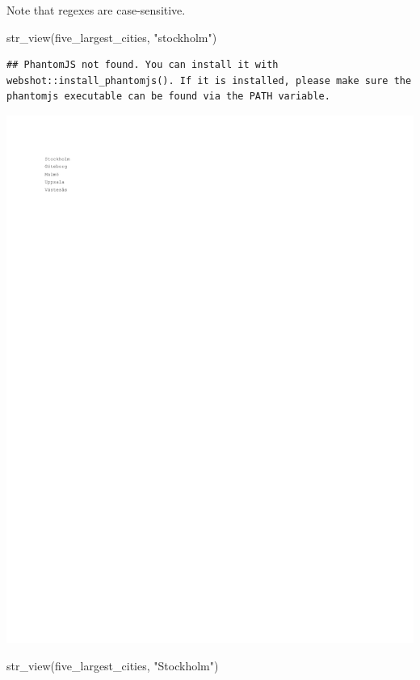 \documentclass[
]{book}
\newenvironment{Shaded}{\begin{snugshade}}{\end{snugshade}}
\newcommand{\FunctionTok}[1]{\textcolor[rgb]{0.00,0.00,0.00}{#1}}
\newcommand{\NormalTok}[1]{#1}
\newcommand{\StringTok}[1]{\textcolor[rgb]{0.31,0.60,0.02}{#1}}
\begin{document}
Note that regexes are case-sensitive.

\begin{Shaded}
\begin{Highlighting}[]
\FunctionTok{str\_view}\NormalTok{(five\_largest\_cities, }\StringTok{"stockholm"}\NormalTok{)}
\end{Highlighting}
\end{Shaded}

\begin{verbatim}
## PhantomJS not found. You can install it with webshot::install_phantomjs(). If it is installed, please make sure the phantomjs executable can be found via the PATH variable.
\end{verbatim}

\includegraphics{_main_files/figure-latex/unnamed-chunk-17-1.pdf}

\begin{Shaded}
\begin{Highlighting}[]
\FunctionTok{str\_view}\NormalTok{(five\_largest\_cities, }\StringTok{"Stockholm"}\NormalTok{)}
\end{Highlighting}
\end{Shaded}
\end{document}
